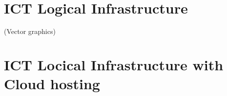 \chapter{ICT Logical Infrastructure}\label{app:ICT}
(Vector graphics)
\begin{landscape}

\end{landscape}


\chapter{ICT Locical Infrastructure with Cloud hosting}\label{app:ICT-Cloud}
\begin{landscape}

\end{landscape}

